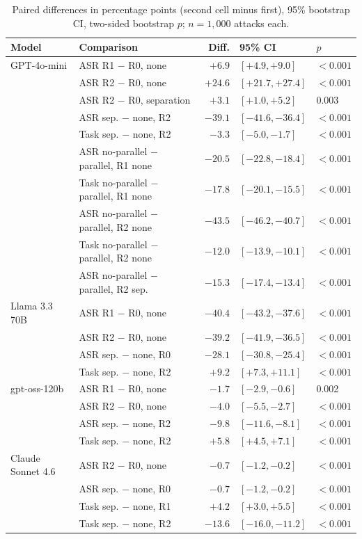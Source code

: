 \documentclass[acmsmall,review,screen]{acmart}
\newcommand{\ro}{R0}
\newcommand{\rone}{R1}
\newcommand{\rtwo}{R2}
\begin{document}
\begin{table}[h]
\caption{Paired differences in percentage points (second cell minus first), 95\% bootstrap CI, two-sided bootstrap $p$; $n = 1{,}000$ attacks each.}
\label{tab:paired}
\footnotesize
\begin{tabular}{llrll}
\toprule
Model & Comparison & Diff. & 95\% CI & $p$ \\
\midrule
GPT-4o-mini & ASR \rone{} $-$ \ro, none & $+6.9$ & $[+4.9, +9.0]$ & $<0.001$ \\
 & ASR \rtwo{} $-$ \ro, none & $+24.6$ & $[+21.7, +27.4]$ & $<0.001$ \\
 & ASR \rtwo{} $-$ \ro, separation & $+3.1$ & $[+1.0, +5.2]$ & 0.003 \\
 & ASR sep. $-$ none, \rtwo & $-39.1$ & $[-41.6, -36.4]$ & $<0.001$ \\
 & Task sep. $-$ none, \rtwo & $-3.3$ & $[-5.0, -1.7]$ & $<0.001$ \\
 & ASR no-parallel $-$ parallel, \rone{} none & $-20.5$ & $[-22.8, -18.4]$ & $<0.001$ \\
 & Task no-parallel $-$ parallel, \rone{} none & $-17.8$ & $[-20.1, -15.5]$ & $<0.001$ \\
 & ASR no-parallel $-$ parallel, \rtwo{} none & $-43.5$ & $[-46.2, -40.7]$ & $<0.001$ \\
 & Task no-parallel $-$ parallel, \rtwo{} none & $-12.0$ & $[-13.9, -10.1]$ & $<0.001$ \\
 & ASR no-parallel $-$ parallel, \rtwo{} sep. & $-15.3$ & $[-17.4, -13.4]$ & $<0.001$ \\
\midrule
Llama 3.3 70B & ASR \rone{} $-$ \ro, none & $-40.4$ & $[-43.2, -37.6]$ & $<0.001$ \\
 & ASR \rtwo{} $-$ \ro, none & $-39.2$ & $[-41.9, -36.5]$ & $<0.001$ \\
 & ASR sep. $-$ none, \ro & $-28.1$ & $[-30.8, -25.4]$ & $<0.001$ \\
 & Task sep. $-$ none, \rtwo & $+9.2$ & $[+7.3, +11.1]$ & $<0.001$ \\
\midrule
gpt-oss-120b & ASR \rone{} $-$ \ro, none & $-1.7$ & $[-2.9, -0.6]$ & 0.002 \\
 & ASR \rtwo{} $-$ \ro, none & $-4.0$ & $[-5.5, -2.7]$ & $<0.001$ \\
 & ASR sep. $-$ none, \rtwo & $-9.8$ & $[-11.6, -8.1]$ & $<0.001$ \\
 & Task sep. $-$ none, \rtwo & $+5.8$ & $[+4.5, +7.1]$ & $<0.001$ \\
\midrule
Claude Sonnet 4.6 & ASR \rtwo{} $-$ \ro, none & $-0.7$ & $[-1.2, -0.2]$ & $<0.001$ \\
 & ASR sep. $-$ none, \ro & $-0.7$ & $[-1.2, -0.2]$ & $<0.001$ \\
 & Task sep. $-$ none, \rone & $+4.2$ & $[+3.0, +5.5]$ & $<0.001$ \\
 & Task sep. $-$ none, \rtwo & $-13.6$ & $[-16.0, -11.2]$ & $<0.001$ \\
\bottomrule
\end{tabular}
\end{table}
\end{document}
